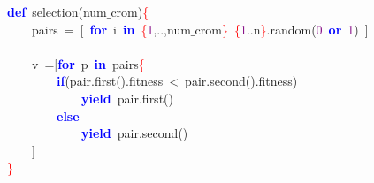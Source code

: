 \noindent
\mbox{}\textbf{\textcolor{Blue}{def}}\ selection\textcolor{BrickRed}{(}num$\_$crom\textcolor{BrickRed}{)}\textcolor{Red}{\{} \\
\mbox{}\ \ \ \ pairs\ \textcolor{BrickRed}{=}\ \textcolor{BrickRed}{[}\ \textbf{\textcolor{Blue}{for}}\ i\ \textbf{\textcolor{Blue}{in}}\ \textcolor{Red}{\{}\textcolor{Purple}{1}\textcolor{BrickRed}{,..,}num$\_$crom\textcolor{Red}{\}}\ \textcolor{Red}{\{}\textcolor{Purple}{1}\textcolor{BrickRed}{..}n\textcolor{Red}{\}}\textcolor{BrickRed}{.}random\textcolor{BrickRed}{(}\textcolor{Purple}{0}\ \textbf{\textcolor{Blue}{or}}\ \textcolor{Purple}{1}\textcolor{BrickRed}{)}\ \textcolor{BrickRed}{]} \\
\mbox{} \\
\mbox{}\ \ \ \ v\ \textcolor{BrickRed}{=[}\textbf{\textcolor{Blue}{for}}\ p\ \textbf{\textcolor{Blue}{in}}\ pairs\textcolor{Red}{\{} \\
\mbox{}\ \ \ \ \ \ \ \ \textbf{\textcolor{Blue}{if}}\textcolor{BrickRed}{(}pair\textcolor{BrickRed}{.}first\textcolor{BrickRed}{().}fitness\ \textcolor{BrickRed}{\textless{}}\ pair\textcolor{BrickRed}{.}second\textcolor{BrickRed}{().}fitness\textcolor{BrickRed}{)} \\
\mbox{}\ \ \ \ \ \ \ \ \ \ \ \ \textbf{\textcolor{Blue}{yield}}\ pair\textcolor{BrickRed}{.}first\textcolor{BrickRed}{()} \\
\mbox{}\ \ \ \ \ \ \ \ \textbf{\textcolor{Blue}{else}} \\
\mbox{}\ \ \ \ \ \ \ \ \ \ \ \ \textbf{\textcolor{Blue}{yield}}\ pair\textcolor{BrickRed}{.}second\textcolor{BrickRed}{()} \\
\mbox{}\ \ \ \ \textcolor{BrickRed}{]} \\
\mbox{}\textcolor{Red}{\}} \\
\mbox{}
